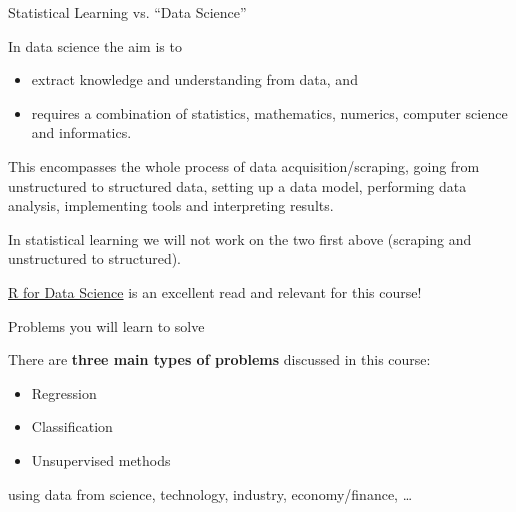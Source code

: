 \documentclass[10pt,ignorenonframetext,]{beamer}
\providecommand{\tightlist}{%
  \setlength{\itemsep}{0pt}\setlength{\parskip}{0pt}}
\begin{document}
\begin{frame}{Statistical Learning vs. ``Data Science''}

In data science the aim is to

\begin{itemize}
\tightlist
\item
  extract knowledge and understanding from data, and
\item
  requires a combination of statistics, mathematics, numerics, computer
  science and informatics.
\end{itemize}

This encompasses the whole process of data acquisition/scraping, going
from unstructured to structured data, setting up a data model,
performing data analysis, implementing tools and interpreting results.

In statistical learning we will not work on the two first above
(scraping and unstructured to structured).

\href{http://r4ds.had.co.nz/}{R for Data Science} is an excellent read
and relevant for this course!

\end{frame}

\begin{frame}{Problems you will learn to solve}

There are \textbf{three main types of problems} discussed in this
course:

\begin{itemize}
\item
  Regression
\item
  Classification
\item
  Unsupervised methods
\end{itemize}

using data from science, technology, industry, economy/finance, \ldots{}

\end{frame}
\end{document}
